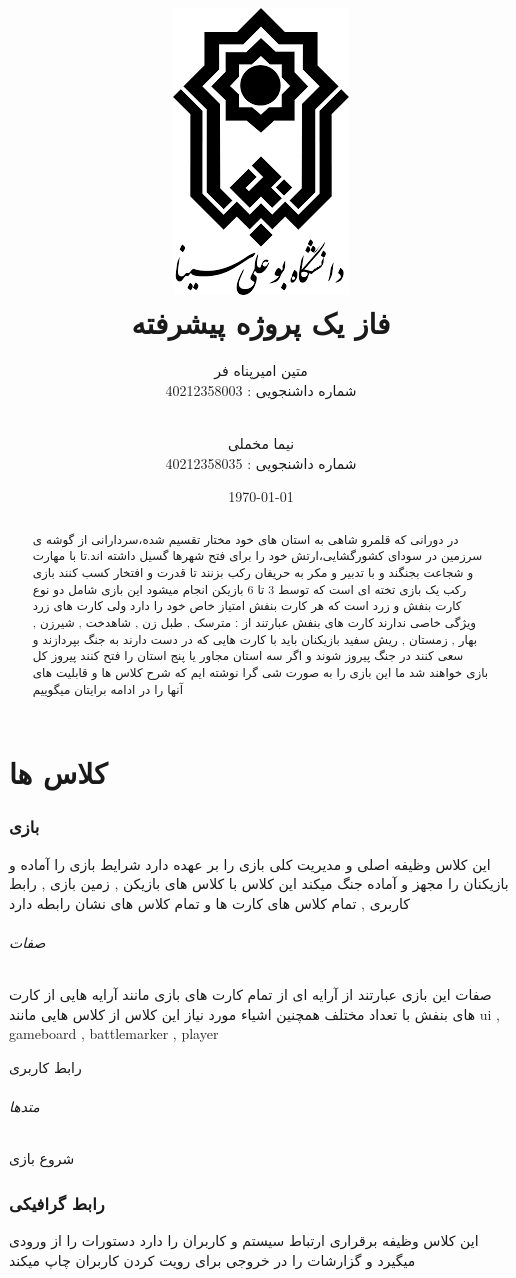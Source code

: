 \documentclass[pdf,titlepage,a4paper]{report}
\title{\includegraphics[scale=0.5]{Graphics/BASU_Logo_header.png} \\ \Huge{فاز یک پروژه پیشرفته}}
\author{متین امیرپناه فر \\ شماره داشنجویی : 40212358003  \and \\ نیما مخملی \\ شماره داشنجویی : 40212358035}
\date{\today}
\begin{document}
	\maketitle
	\tableofcontents
	
	\begin{abstract}
	 در دورانی که قلمرو شاهی به استان های خود مختار تقسیم شده،سردارانی از گوشه ی سرزمین در سودای کشورگشایی،ارتش خود را برای فتح شهرها گسیل داشته اند.تا با مهارت و شجاعت بجنگند و با تدبیر و مکر به حریفان رکب بزنند تا قدرت و افتخار کسب کنند
	 بازی رکب یک بازی تخته ای است که توسط 3 تا 6 بازیکن انجام میشود 
	 این بازی شامل دو نوع کارت بنفش و زرد است که هر کارت بنفش امتیاز خاص خود را دارد ولی کارت های زرد ویژگی خاصی ندارند
	 کارت های بنفش عبارتند از : مترسک , طبل زن , شاهدخت ,  شیرزن  ,  بهار  , زمستان , ریش سفید 
	 بازیکنان باید با کارت هایی که در دست دارند به جنگ بپردازند و سعی کنند در جنگ پیروز شوند و اگر سه استان مجاور یا پنج استان را فتح کنند پیروز کل بازی خواهند شد 
	 ما این بازی را به صورت شی گرا نوشته ایم که شرح کلاس ها و قابلیت های آنها را در ادامه برایتان میگوییم 
	\end{abstract}


	\part{کلاس ها}
		
	\newpage
	\section{بازی}
	این کلاس وظیفه اصلی و مدیریت کلی بازی را بر عهده دارد شرایط بازی را آماده و بازیکنان را مجهز و آماده جنگ میکند
	این کلاس با کلاس های بازیکن , زمین بازی , رابط کاربری , تمام کلاس های کارت ها و تمام کلاس های نشان رابطه دارد
	\paragraph{صفات}
	صفات این بازی عبارتند از آرایه ای از تمام کارت های بازی مانند آرایه هایی از کارت های بنفش با تعداد مختلف
	همچنین اشیاء مورد نیاز این کلاس از کلاس هایی مانند ui , gameboard , battlemarker , player

	\subparagraph{رابط کاربری}
	\paragraph{متدها}
	\subparagraph{شروع بازی}
	
	
	\newpage
	\section{رابط گرافیکی}
	این کلاس وظیفه برقراری ارتباط سیستم و کاربران را دارد دستورات را از ورودی میگیرد و گزارشات را در خروجی برای رویت کردن کاربران چاپ میکند
\end{document}
